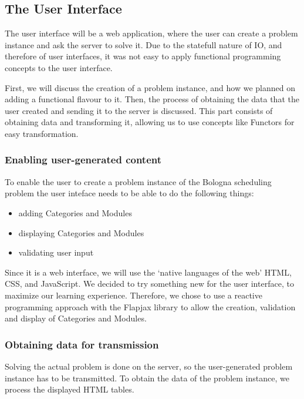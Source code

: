 \documentclass[a4paper]{article}
\begin{document}
\subsection{The User Interface}
\label{sec:design-ui}
The user interface will be a web application, 
where the user can create a problem instance and ask the server to solve it.
Due to the statefull nature of IO, and therefore of user interfaces,
it was not easy to apply functional programming concepts to the user interface.

First, we will discuss the creation of a problem instance, 
and how we planned on adding a functional flavour to it.
Then, the process of obtaining the data that the user created and sending
it to the server is discussed.
This part consists of obtaining data and transforming it, 
allowing us to use concepts like Functors for easy transformation.

\subsubsection{Enabling user-generated content}
To enable the user to create a problem instance of the Bologna scheduling problem
the user inteface needs to be able to do the following things:
\begin{itemize}
	\item adding Categories and Modules
	\item displaying Categories and Modules
	\item validating user input
\end{itemize}
Since it is a web interface, we will use the `native languages of the web' HTML, CSS,
and JavaScript.
We decided to try something new for the user interface, 
to maximize our learning experience.
Therefore, we chose to use a reactive programming approach with the Flapjax library \cite{flapjax} to allow the creation, validation and display of Categories and Modules.

\subsubsection{Obtaining data for transmission}
\label{sec:ObtainingDataForTransmission}
Solving the actual problem is done on the server, so the
user-generated problem instance has to be transmitted. To obtain the
data of the problem instance, we process the displayed HTML tables.\\
\end{document}
